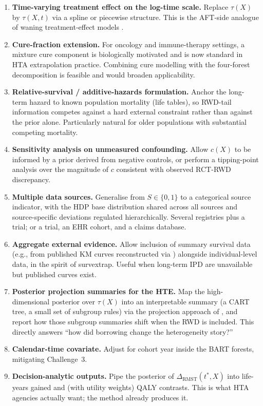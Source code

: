 \documentclass[11pt]{article}
\theoremstyle{plain}
\theoremstyle{definition}
\theoremstyle{remark}
\newcommand{\1}{\mathds{1}}
\newcommand{\X}{X}
\newcommand{\Sx}{S}
\newcommand{\tauf}{\tau}
\newcommand{\cf}{c}
\newcommand{\RMST}{\mathrm{RMST}}
\begin{document}
\begin{enumerate}[label=(E\arabic*), leftmargin=*]
  \item \textbf{Time-varying treatment effect on the log-time scale.}
        Replace $\tauf(\X)$ by $\tauf(\X, t)$ via a spline or piecewise
        structure. This is the AFT-side analogue of waning treatment-effect
        models \citep{Jackson2023}.
  \item \textbf{Cure-fraction extension.}
        For oncology and immune-therapy settings, a mixture cure component
        is biologically motivated and is now standard in HTA extrapolation
        practice. Combining cure modelling with the four-forest decomposition
        is feasible and would broaden applicability.
  \item \textbf{Relative-survival / additive-hazards formulation.}
        Anchor the long-term hazard to known population mortality (life
        tables), so RWD-tail information competes against a hard external
        constraint rather than against the prior alone. Particularly natural
        for older populations with substantial competing mortality.
  \item \textbf{Sensitivity analysis on unmeasured confounding.}
        Allow $\cf(\X)$ to be informed by a prior derived from negative
        controls, or perform a tipping-point analysis over the magnitude of
        $\cf$ consistent with observed RCT-RWD discrepancy.
  \item \textbf{Multiple data sources.}
        Generalise from $\Sx \in \{0,1\}$ to a categorical source indicator,
        with the HDP base distribution shared across all sources and
        source-specific deviations regulated hierarchically. Several
        registries plus a trial; or a trial, an EHR cohort, and a claims
        database.
  \item \textbf{Aggregate external evidence.}
        Allow inclusion of summary survival data (e.g., from published KM
        curves reconstructed via \citet{Guyot2012}) alongside individual-level
        data, in the spirit of survextrap. Useful when long-term IPD are
        unavailable but published curves exist.
  \item \textbf{Posterior projection summaries for the HTE.}
        Map the high-dimensional posterior over $\tauf(\X)$ into an
        interpretable summary (a CART tree, a small set of subgroup rules)
        via the projection approach of \citet{Woody2020}, and report
        how those subgroup summaries shift when the RWD is included.
        This directly answers ``how did borrowing change the
        heterogeneity story?''
  \item \textbf{Calendar-time covariate.}
        Adjust for cohort year inside the BART forests, mitigating
        Challenge~3.
  \item \textbf{Decision-analytic outputs.}
        Pipe the posterior of $\Delta_{\RMST}(t^*, \X)$ into life-years
        gained and (with utility weights) QALY contrasts. This is what HTA
        agencies actually want; the method already produces it.
\end{enumerate}
\end{document}
